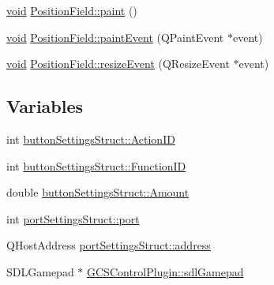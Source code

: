 \begin{DoxyCompactItemize}
\hyperlink{group___u_a_v_objects_plugin_ga444cf2ff3f0ecbe028adce838d373f5c}{void} \hyperlink{group___g_c_s_control_gadget_plugin_ga24b8b76a9c4255dc4777eed27af0a5de}{\-Position\-Field\-::paint} ()
\item 
\hyperlink{group___u_a_v_objects_plugin_ga444cf2ff3f0ecbe028adce838d373f5c}{void} \hyperlink{group___g_c_s_control_gadget_plugin_gad910afda0ec90e5e5e1dd3abd854f709}{\-Position\-Field\-::paint\-Event} (\-Q\-Paint\-Event $\ast$event)
\item 
\hyperlink{group___u_a_v_objects_plugin_ga444cf2ff3f0ecbe028adce838d373f5c}{void} \hyperlink{group___g_c_s_control_gadget_plugin_ga4f1879516e3c2fb610a4ebe9f5cb217e}{\-Position\-Field\-::resize\-Event} (\-Q\-Resize\-Event $\ast$event)
\end{DoxyCompactItemize}
\subsection*{\-Variables}
\begin{DoxyCompactItemize}
\item 
int \hyperlink{group___g_c_s_control_gadget_plugin_ga03093dd46af520daf9f990be1e2fe9c6}{button\-Settings\-Struct\-::\-Action\-I\-D}
\item 
int \hyperlink{group___g_c_s_control_gadget_plugin_ga0cf7694f3cc910d158e54851d077dd22}{button\-Settings\-Struct\-::\-Function\-I\-D}
\item 
double \hyperlink{group___g_c_s_control_gadget_plugin_gaaa14aa6512e6e46a95fcfd01c675cbf7}{button\-Settings\-Struct\-::\-Amount}
\item 
int \hyperlink{group___g_c_s_control_gadget_plugin_ga0f8fc6e0cdd5eac4d00a2b169f94c7a3}{port\-Settings\-Struct\-::port}
\item 
\-Q\-Host\-Address \hyperlink{group___g_c_s_control_gadget_plugin_ga4a1de1267a23f01dad6562a23ddf70f8}{port\-Settings\-Struct\-::address}
\item 
\-S\-D\-L\-Gamepad $\ast$ \hyperlink{group___g_c_s_control_gadget_plugin_ga3cd3b8ed3b17b5405fb2f71803a65951}{\-G\-C\-S\-Control\-Plugin\-::sdl\-Gamepad}
\end{DoxyCompactItemize}
